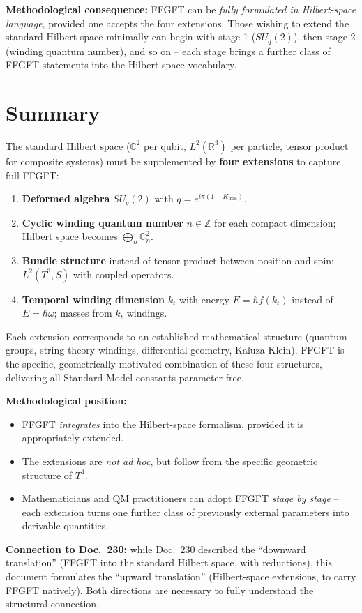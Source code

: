 \textbf{Methodological consequence:} FFGFT can be \emph{fully
formulated in Hilbert-space language}, provided one accepts the four
extensions. Those wishing to extend the standard Hilbert space
minimally can begin with stage 1 ($SU_q(2)$), then stage 2 (winding
quantum number), and so on -- each stage brings a further class of
FFGFT statements into the Hilbert-space vocabulary.

\section{Summary}

The standard Hilbert space ($\mathbb{C}^2$ per qubit, $L^2(\mathbb{R}^3)$
per particle, tensor product for composite systems) must be supplemented
by \textbf{four extensions} to capture full FFGFT:

\begin{enumerate}[leftmargin=2em,itemsep=2pt,topsep=2pt]
  \item \textbf{Deformed algebra} $SU_q(2)$ with
        $q = e^{i\pi(1-K_{\text{frak}})}$.
  \item \textbf{Cyclic winding quantum number} $n \in \mathbb{Z}$ for
        each compact dimension; Hilbert space becomes
        $\bigoplus_n \mathbb{C}^2_n$.
  \item \textbf{Bundle structure} instead of tensor product between
        position and spin: $L^2(T^3, S)$ with coupled operators.
  \item \textbf{Temporal winding dimension} $k_t$ with energy
        $E = \hbar f(k_t)$ instead of $E = \hbar\omega$; masses from
        $k_t$ windings.
\end{enumerate}

Each extension corresponds to an established mathematical structure
(quantum groups, string-theory windings, differential geometry,
Kaluza-Klein). FFGFT is the specific, geometrically motivated
combination of these four structures, delivering all
Standard-Model constants parameter-free.

\textbf{Methodological position:}
\begin{itemize}[leftmargin=2em,itemsep=2pt,topsep=2pt]
  \item FFGFT \emph{integrates} into the Hilbert-space formalism,
        provided it is appropriately extended.
  \item The extensions are \emph{not ad hoc}, but follow from the
        specific geometric structure of $T^4$.
  \item Mathematicians and QM practitioners can adopt FFGFT
        \emph{stage by stage} -- each extension turns one further
        class of previously external parameters into derivable
        quantities.
\end{itemize}

\textbf{Connection to Doc.~230:} while Doc.~230 described the
\enquote{downward translation} (FFGFT into the standard Hilbert
space, with reductions), this document formulates the
\enquote{upward translation} (Hilbert-space extensions, to carry
FFGFT natively). Both directions are necessary to fully understand
the structural connection.

